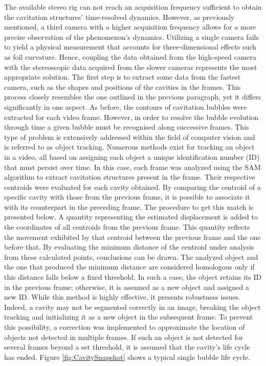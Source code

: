 The available stereo rig can not reach an acquisition frequency sufficient to obtain the cavitation structures' time-resolved dynamics. 
However, as previously mentioned, a third camera with a higher acquisition frequency allows for a more precise observation of the phenomenon's dynamics. Utilizing a single camera fails to yield a physical measurement that accounts for three-dimensional effects such as foil curvature. Hence, coupling the data obtained from the high-speed camera with the stereoscopic data acquired from the slower cameras represents the most appropriate solution.
The first step is to extract some data from the fastest camera, such as the shapes and positions of the cavities in the frames. This process closely resembles the one outlined in the previous paragraph, yet it differs significantly in one aspect. As before, the contours of cavitation bubbles were extracted for each video frame. 
However, in order to resolve the bubble evolution through time a given bubble must be recognised along successive frames.
This type of problem is extensively addressed within the field of computer vision and is referred to as object tracking. Numerous methods exist for tracking an object in a video, all based on assigning each object a unique identification number (ID) that must persist over time.
In this case, each frame was analyzed using the SAM algorithm to extract cavitation structures present in the frame. Their respective centroids were evaluated for each cavity obtained. By comparing the centroid of a specific cavity with those from the previous frame, it is possible to associate it with its counterpart in the preceding frame.
The procedure to get this match is presented below.
A quantity representing the estimated displacement is added to the coordinates of all centroids from the previous frame. This quantity reflects the movement exhibited by that centroid between the previous frame and the one before that. By evaluating the minimum distance of the centroid under analysis from these calculated points, conclusions can be drawn. The analyzed object and the one that produced the minimum distance are considered homologous only if this distance falls below a fixed threshold. In such a case, the object retains its ID in the previous frame; otherwise, it is assumed as a new object and assigned a new ID.
While this method is highly effective, it presents robustness issues. Indeed, a cavity may not be segmented correctly in an image, breaking the object tracking and initializing it as a new object in the subsequent frame. To prevent this possibility, a correction was implemented to approximate the location of objects not detected in multiple frames. If such an object is not detected for several frames beyond a set threshold, it is assumed that the cavity's life cycle has ended. Figure \ref{fig:CavitySnapshot} shows a typical single bubble life cycle.

